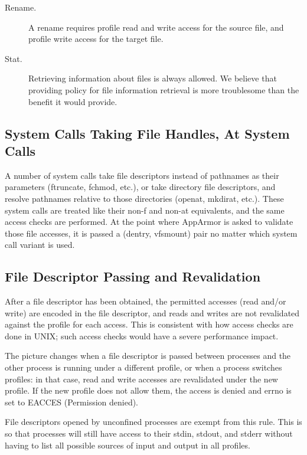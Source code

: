 \documentclass[a4paper]{article}
\begin{document}
\begin{description}
\item[Rename.]
A rename requires profile read and write access for the source
file, and profile write access for the target file.

\item[Stat.]
Retrieving information about files is always allowed. We believe
that providing policy for file information retrieval is more
troublesome than the benefit it would provide.

\end{description}


\subsection{System Calls Taking File Handles, At System Calls}

A number of system calls take file descriptors instead of pathnames as
their parameters (ftruncate, fchmod, etc.), or take directory file
descriptors, and resolve pathnames relative to those directories
(openat, mkdirat, etc.).  These system calls are treated like their
non-f and non-at equivalents, and the same access checks are performed.
At the point where AppArmor is asked to validate those file accesses, it
is passed a (dentry, vfsmount) pair no matter which system call variant
is used.


\subsection{File Descriptor Passing and Revalidation}

After a file descriptor has been obtained, the permitted accesses (read
and/or write) are encoded in the file descriptor, and reads and writes
are not revalidated against the profile for each access.  This is
consistent with how access checks are done in UNIX; such access checks
would have a severe performance impact.

The picture changes when a file descriptor is passed between processes
and the other process is running under a different profile, or when a
process switches profiles: in that case, read and write accesses are
revalidated under the new profile.  If the new profile does not allow
them, the access is denied and errno is set to EACCES (Permission
denied).

File descriptors opened by unconfined processes are exempt from this
rule.  This is so that processes will still have access to their stdin,
stdout, and stderr without having to list all possible sources of input
and output in all profiles.
\end{document}
